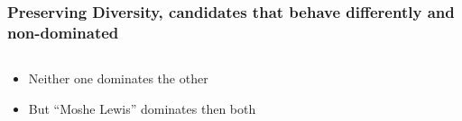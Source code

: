\documentclass{beamer}
\begin{document}
\frame
{
  \frametitle{Preserving Diversity, 
    candidates that behave differently and non-dominated}

  \pause


  \begin{center}


  \end{center}

  \begin{columns}
    
    \column{0.5in}

    \column{1in}

    \column{1.5in}
    
  \end{columns}

  \begin{itemize}
  \item<4-> Neither one dominates the other
  \item<5-> But ``Moshe Lewis'' dominates then both
  \end{itemize}
}  
\end{document}
